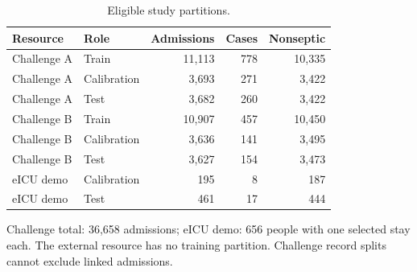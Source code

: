 \begin{table}[tbp]
\centering
\small
\setlength{\tabcolsep}{4pt}
\renewcommand{\arraystretch}{1.18}
\caption{Eligible study partitions.}\label{tab:cohort}
\begin{tabular}{llrrr}
\toprule
Resource & Role & Admissions & Cases & Nonseptic \\
\midrule
Challenge A & Train & 11,113 & 778 & 10,335 \\
Challenge A & Calibration & 3,693 & 271 & 3,422 \\
Challenge A & Test & 3,682 & 260 & 3,422 \\
Challenge B & Train & 10,907 & 457 & 10,450 \\
Challenge B & Calibration & 3,636 & 141 & 3,495 \\
Challenge B & Test & 3,627 & 154 & 3,473 \\
eICU demo & Calibration & 195 & 8 & 187 \\
eICU demo & Test & 461 & 17 & 444 \\
\bottomrule
\end{tabular}
\par\vspace{3pt}\begin{minipage}{\linewidth}\footnotesize Challenge total: 36,658 admissions; eICU demo: 656 people with one selected stay each. The external resource has no training partition. Challenge record splits cannot exclude linked admissions.\end{minipage}
\end{table}
